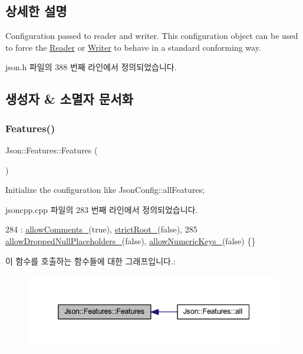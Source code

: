 \subsection{상세한 설명}
Configuration passed to reader and writer. This configuration object can be used to force the \hyperlink{class_json_1_1_reader}{Reader} or \hyperlink{class_json_1_1_writer}{Writer} to behave in a standard conforming way. 

json.\+h 파일의 388 번째 라인에서 정의되었습니다.



\subsection{생성자 \& 소멸자 문서화}
\mbox{\label{class_json_1_1_features_ad15a091cb61bb31323299a95970d2644}} 
\subsubsection{\texorpdfstring{Features()}{Features()}}
{\footnotesize\ttfamily Json\+::\+Features\+::\+Features (\begin{DoxyParamCaption}{ }\end{DoxyParamCaption})}



Initialize the configuration like Json\+Config\+::all\+Features; 



jsoncpp.\+cpp 파일의 283 번째 라인에서 정의되었습니다.


\begin{DoxyCode}
284     : \hyperlink{class_json_1_1_features_a33afd389719624b6bdb23950b3c346c9}{allowComments\_}(\textcolor{keyword}{true}), \hyperlink{class_json_1_1_features_a1162c37a1458adc32582b585b552f9c3}{strictRoot\_}(\textcolor{keyword}{false}),
285       \hyperlink{class_json_1_1_features_a5076aa72c05c7596ac339ede36c97a6a}{allowDroppedNullPlaceholders\_}(\textcolor{keyword}{false}), 
      \hyperlink{class_json_1_1_features_aff3cb16b79d15d3d761b11a0dd6d4d6b}{allowNumericKeys\_}(\textcolor{keyword}{false}) \{\}
\end{DoxyCode}
이 함수를 호출하는 함수들에 대한 그래프입니다.\+:\nopagebreak
\begin{figure}[H]
\begin{center}
\leavevmode
\includegraphics[width=338pt]{class_json_1_1_features_ad15a091cb61bb31323299a95970d2644_icgraph}
\end{center}
\end{figure}


